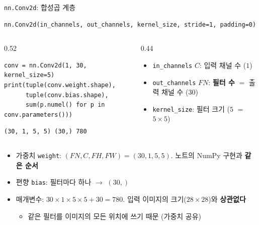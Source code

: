 \documentclass[aspectratio=169,11pt]{beamer}
\newcommand{\code}[1]{\texttt{#1}}
\begin{document}
\begin{frame}[fragile]{\code{nn.Conv2d}: 합성곱 계층}
\begin{lstlisting}
nn.Conv2d(in_channels, out_channels, kernel_size, stride=1, padding=0)
\end{lstlisting}
\begin{columns}[T,onlytextwidth]
\begin{column}{0.52\textwidth}
\begin{lstlisting}
conv = nn.Conv2d(1, 30, kernel_size=5)
print(tuple(conv.weight.shape),
      tuple(conv.bias.shape),
      sum(p.numel() for p in conv.parameters()))
\end{lstlisting}
\begin{lstlisting}[style=outstyle]
(30, 1, 5, 5) (30,) 780
\end{lstlisting}
\end{column}
\begin{column}{0.44\textwidth}
\small
\begin{itemize}
\item \code{in\_channels} $C$: 입력 채널 수 ($1$)
\item \code{out\_channels} $FN$: \textbf{필터 수} $=$ 출력 채널 수 ($30$)
\item \code{kernel\_size}: 필터 크기 ($5$ $=$ $5\times5$)
\end{itemize}
\end{column}
\end{columns}
\vskip1mm
\begin{itemize}
\item 가중치 \code{weight}: $(FN, C, FH, FW)=(30,1,5,5)$. 노트의 NumPy 구현과 \textbf{같은 순서}
\item 편향 \code{bias}: 필터마다 하나 $\to$ $(30,)$
\item 매개변수: $30\times1\times5\times5+30=780$. 입력 이미지의 크기($28\times28$)와 \textbf{상관없다}
\begin{itemize}
\item 같은 필터를 이미지의 모든 위치에 쓰기 때문 (가중치 공유)
\end{itemize}
\end{itemize}
\end{frame}
\end{document}
